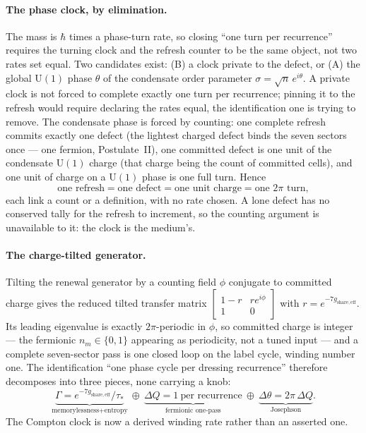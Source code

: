 \documentclass[11pt]{article}
\begin{document}
\paragraph{The phase clock, by elimination.}
The mass is $\hbar$ times a phase-turn rate, so closing ``one turn per recurrence'' requires the turning clock and the refresh counter to be the same object, not two rates set equal. Two candidates exist: (B) a clock private to the defect, or (A) the global $\mathrm{U}(1)$ phase $\theta$ of the condensate order parameter $\sigma=\sqrt n\,e^{i\theta}$. A private clock is not forced to complete exactly one turn per recurrence; pinning it to the refresh would require declaring the rates equal, the identification one is trying to remove. The condensate phase is forced by counting: one complete refresh commits exactly one defect (the lightest charged defect binds the seven sectors once --- one fermion, Postulate~II), one committed defect is one unit of the condensate $\mathrm{U}(1)$ charge (that charge being the count of committed cells), and one unit of charge on a $\mathrm{U}(1)$ phase is one full turn. Hence
\[
\text{one refresh}=\text{one defect}=\text{one unit charge}=\text{one }2\pi\text{ turn},
\]
each link a count or a definition, with no rate chosen. A lone defect has no conserved tally for the refresh to increment, so the counting argument is unavailable to it: the clock is the medium's.

\paragraph{The charge-tilted generator.}
Tilting the renewal generator by a counting field $\phi$ conjugate to committed charge gives the reduced tilted transfer matrix $\left[\begin{smallmatrix}1-r & re^{i\phi}\\ 1 & 0\end{smallmatrix}\right]$ with $r=e^{-7g_{\mathrm{share,eff}}}$. Its leading eigenvalue is exactly $2\pi$-periodic in $\phi$, so committed charge is integer --- the fermionic $n_m\in\{0,1\}$ appearing as periodicity, not a tuned input --- and a complete seven-sector pass is one closed loop on the label cycle, winding number one. The identification ``one phase cycle per dressing recurrence'' therefore decomposes into three pieces, none carrying a knob:
\[
\underbrace{\Gamma=e^{-7g_{\mathrm{share,eff}}}/\tau_*}_{\text{memorylessness}+\text{entropy}}
\ \oplus\
\underbrace{\Delta Q=1\ \text{per recurrence}}_{\text{fermionic one-pass}}
\ \oplus\
\underbrace{\Delta\theta=2\pi\,\Delta Q}_{\text{Josephson}}.
\]
The Compton clock is now a derived winding rate rather than an asserted one.
\end{document}
